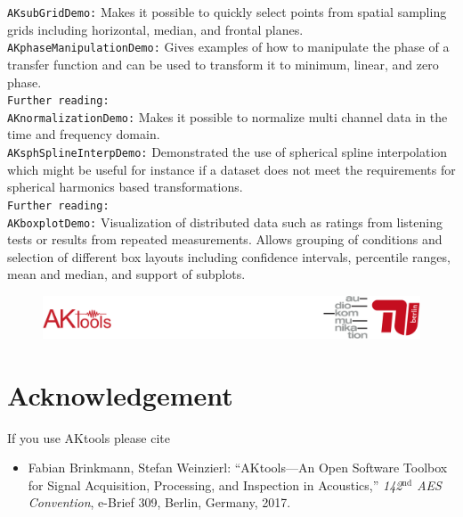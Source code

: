 \documentclass[11pt]{scrartcl}
\begin{document}
\noindent
{\color{tu_red}\texttt{AKsubGridDemo:}} Makes it possible to quickly select points from spatial sampling grids including horizontal, median, and frontal planes.\\

\noindent
{\color{tu_red}\texttt{AKphaseManipulationDemo:}} Gives examples of how to manipulate the phase of a transfer function and can be used to transform it to minimum, linear, and zero phase.\\
\texttt{Further reading:} \citet{Oppenheim1999}\\

\noindent
{\color{tu_red}\texttt{AKnormalizationDemo:}} Makes it possible to normalize multi channel data in the time and frequency domain.\\

\noindent
{\color{tu_red}\texttt{AKsphSplineInterpDemo:}} Demonstrated the use of spherical spline interpolation which might be useful for instance if a dataset does not meet the requirements for spherical harmonics based transformations.\\
\texttt{Further reading:} \citet{Wahba1981, Wahba1982}\\

\noindent
{\color{tu_red}\texttt{AKboxplotDemo:}} Visualization of distributed data such as ratings from listening tests or results from repeated measurements. Allows grouping of conditions and selection of different box layouts including confidence intervals, percentile ranges, mean and median, and support of subplots.\\

\vfill
\begin{figure}[b!]
  \center
  \includegraphics[width=1\textwidth]{logo_footer}
\end{figure}

\clearpage
\section*{{\color{tu_red}Acknowledgement}}
If you use AKtools please cite
\begin{itemize}
	\item[] Fabian Brinkmann, Stefan Weinzierl: ``AKtools---An Open Software Toolbox for Signal Acquisition, Processing, and Inspection in Acoustics,'' \emph{142$^\text{nd}$ AES Convention}, e-Brief 309, Berlin, Germany, 2017.
\end{itemize}
\vfill
\end{document}
